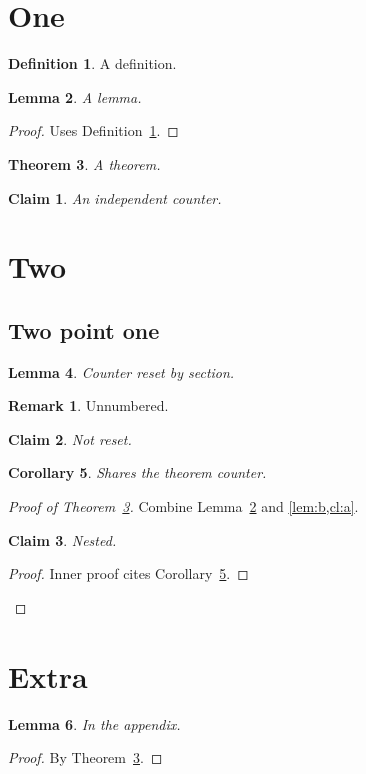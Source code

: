 \documentclass{amsart}
\newtheorem{theorem}{Theorem}[section]
\newtheorem{lemma}[theorem]{Lemma}
\newtheorem{corollary}[theorem]{Corollary}
\newtheorem{claim}{Claim}
\theoremstyle{definition}\newtheorem{definition}[theorem]{Definition}
\newtheorem*{remark*}{Remark}
\begin{document}
\section{One}
\begin{definition}\label{def:a}A definition.\end{definition}
\begin{lemma}\label{lem:a}A lemma.\end{lemma}
\begin{proof}Uses Definition~\ref{def:a}.\end{proof}
\begin{theorem}\label{thm:a}A theorem.\end{theorem}
\begin{claim}\label{cl:a}An independent counter.\end{claim}
\section{Two}
\subsection{Two point one}
\begin{lemma}\label{lem:b}Counter reset by section.\end{lemma}
\begin{remark*}Unnumbered.\end{remark*}
\begin{claim}\label{cl:b}Not reset.\end{claim}
\begin{corollary}\label{cor:b}Shares the theorem counter.\end{corollary}
\begin{proof}[Proof of Theorem~\ref{thm:a}]
Combine Lemma~\ref{lem:a} and \cref{lem:b,cl:a}.
\begin{claim}\label{cl:inner}Nested.\end{claim}
\begin{proof}Inner proof cites Corollary~\ref{cor:b}.\end{proof}
\end{proof}
\appendix
\section{Extra}
\begin{lemma}\label{lem:app}In the appendix.\end{lemma}
\begin{proof}
By Theorem~\ref{thm:a}.
\end{proof}
\end{document}
